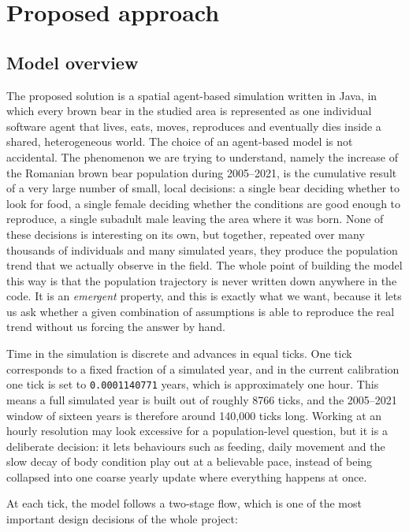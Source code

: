 \chapter{Proposed approach}
\label{ch:approach}

\section{Model overview}

The proposed solution is a spatial agent-based simulation written in Java, in which every brown bear in the studied area is represented as one individual software agent that lives, eats, moves, reproduces and eventually dies inside a shared, heterogeneous world. The choice of an agent-based model is not accidental. The phenomenon we are trying to understand, namely the increase of the Romanian brown bear population during 2005--2021, is the cumulative result of a very large number of small, local decisions: a single bear deciding whether to look for food, a single female deciding whether the conditions are good enough to reproduce, a single subadult male leaving the area where it was born. None of these decisions is interesting on its own, but together, repeated over many thousands of individuals and many simulated years, they produce the population trend that we actually observe in the field. The whole point of building the model this way is that the population trajectory is never written down anywhere in the code. It is an \emph{emergent} property, and this is exactly what we want, because it lets us ask whether a given combination of assumptions is able to reproduce the real trend without us forcing the answer by hand.

Time in the simulation is discrete and advances in equal ticks. One tick corresponds to a fixed fraction of a simulated year, and in the current calibration one tick is set to \texttt{0.0001140771} years, which is approximately one hour. This means a full simulated year is built out of roughly 8766 ticks, and the 2005--2021 window of sixteen years is therefore around 140{,}000 ticks long. Working at an hourly resolution may look excessive for a population-level question, but it is a deliberate decision: it lets behaviours such as feeding, daily movement and the slow decay of body condition play out at a believable pace, instead of being collapsed into one coarse yearly update where everything happens at once.

At each tick, the model follows a two-stage flow, which is one of the most important design decisions of the whole project:

